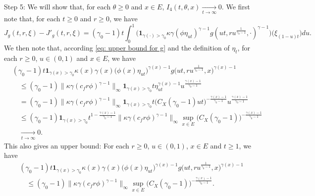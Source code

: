 \documentclass[12pt, a4paper]{amsart}
\theoremstyle{definition}
\numberwithin{equation}{section}
\begin{document}
	Step 5: We will show that, for each $\theta \geq 0$ and $x\in E$, $I_4(t,\theta,x) \xrightarrow[t\to \infty]{} 0$.
	We first note that, for each $t\geq 0$ and $r\geq 0$, we have
\begin{equation}\label{eq: expression for J_g - J'_g}
	J_g(t,r,\xi) - J'_g(t,r,\xi)
	= (\gamma_0 - 1)t\int_0^1 \big( \mathbf 1_{\gamma(\cdot )> \gamma_0}  \kappa\gamma (   \phi \eta_{ut}   )^{\gamma - 1} g (ut,ru^{\frac{1}{\gamma_0 - 1}},\cdot )^{\gamma-1}  \big) \big(  \xi_{(1-u)t}  \big) du.
\end{equation}
	We then note that, according \eqref{eq: upper bound for g} and the definition of $\eta_t$, for each $r\geq 0$, $u\in (0,1)$ and $x\in E$, we have
\begin{equation}\label{eq: integer in the expression of J_g - J'_g convergences to 0}\begin{split}
	&(\gamma_0 - 1)t  \mathbf 1_{\gamma(x)> \gamma_0}  \kappa(x)\gamma(x) \big(   \phi(x) \eta_{ut}   \big)^{\gamma(x) - 1} g \big(ut,ru^{\frac{1}{\gamma_0 - 1}},x \big)^{\gamma(x)-1}
	\\&\quad \leq (\gamma_0 - 1) \big\| \kappa \gamma (c_f r\phi)^{\gamma - 1}\big\|_\infty \mathbf 1_{\gamma(x) > \gamma_0} t \eta_{ut}^{\gamma(x) - 1} u^{\frac{\gamma(x) - 1}{\gamma_0 - 1}}
	\\&\quad = (\gamma_0 - 1) \big\| \kappa \gamma (c_f r\phi)^{\gamma - 1}\big\|_\infty \mathbf 1_{\gamma(x) > \gamma_0} t \big( C_X(\gamma_0 - 1) ut\big)^{-\frac{\gamma(x) - 1}{\gamma_0 - 1}} u^{\frac{\gamma(x) - 1}{\gamma_0 - 1}}
	\\&\quad \leq (\gamma_0 - 1) \mathbf 1_{\gamma(x) > \gamma_0} t^{1-\frac{\gamma(x) - 1}{\gamma_0 - 1}}\big\| \kappa \gamma (c_f r\phi)^{\gamma - 1}\big\|_\infty \sup_{x\in E} \big( C_X(\gamma_0 - 1) \big)^{-\frac{\gamma(x) - 1}{\gamma_0 - 1}}
	\\&\quad \xrightarrow[t\to \infty]{} 0.
\end{split}\end{equation}
	This also gives an upper bound: For each $r\geq 0$, $u \in (0,1)$, $x\in E$ and $t\geq 1$, we have
\begin{equation}\label{eq: upper bound for the integrator of J_g - J'_g} \begin{split}
	&(\gamma_0 - 1)t  \mathbf 1_{\gamma(x)> \gamma_0}  \kappa(x)\gamma(x) \big(   \phi(x) \eta_{ut}   \big)^{\gamma(x) - 1} g \big(ut,ru^{\frac{1}{\gamma_0 - 1}},x \big)^{\gamma(x)-1}
	\\&\quad \leq (\gamma_0 - 1) \big\| \kappa \gamma (c_f r\phi)^{\gamma - 1}\big\|_\infty \sup_{x\in E} \big( C_X(\gamma_0 - 1) \big)^{-\frac{\gamma(x) - 1}{\gamma_0 - 1}}.
\end{split}\end{equation}
\end{document}
